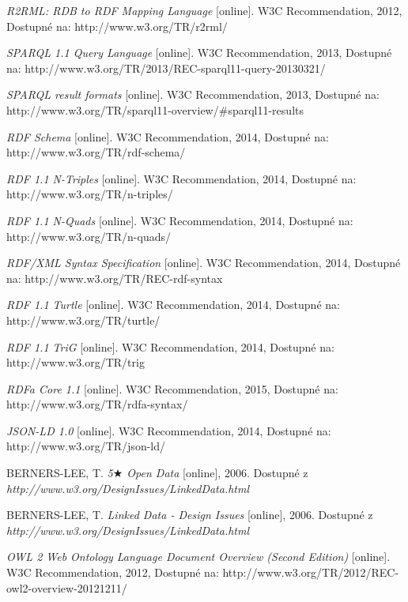 \begin{thebibliography}{99}
  \emph{R2RML: RDB to RDF Mapping Language} 
  [online]. W3C Recommendation, 2012, Dostupné na: 
  http://www.w3.org/TR/r2rml/
  
  \emph{SPARQL 1.1 Query Language} 
  [online]. W3C Recommendation, 2013, Dostupné na: 
  http://www.w3.org/TR/2013/REC-sparql11-query-20130321/

  \emph{SPARQL result formats} 
  [online]. W3C Recommendation, 2013, Dostupné na: 
  http://www.w3.org/TR/sparql11-overview/\#sparql11-results
  
  \emph{RDF Schema} 
  [online]. W3C Recommendation, 2014, Dostupné na: 
  http://www.w3.org/TR/rdf-schema/ 
  
  \emph{RDF 1.1 N-Triples} 
  [online]. W3C Recommendation, 2014, Dostupné na: 
  http://www.w3.org/TR/n-triples/ 
  
  \emph{RDF 1.1 N-Quads} 
  [online]. W3C Recommendation, 2014, Dostupné na: 
  http://www.w3.org/TR/n-quads/ 

  \emph{RDF/XML Syntax Specification} 
  [online]. W3C Recommendation, 2014, Dostupné na: 
  http://www.w3.org/TR/REC-rdf-syntax 
  
  \emph{RDF 1.1 Turtle} 
  [online]. W3C Recommendation, 2014, Dostupné na: 
  http://www.w3.org/TR/turtle/

  \emph{RDF 1.1 TriG} 
  [online]. W3C Recommendation, 2014, Dostupné na: 
  http://www.w3.org/TR/trig
  
  \emph{RDFa Core 1.1} 
  [online]. W3C Recommendation, 2015, Dostupné na: 
  http://www.w3.org/TR/rdfa-syntax/
  
  \emph{JSON-LD 1.0} 
  [online]. W3C Recommendation, 2014, Dostupné na: 
  http://www.w3.org/TR/json-ld/

  BERNERS-LEE, T.
  \emph{5$\bigstar$ Open Data}
  [online], 2006. Dostupné z 
  \emph{http://www.w3.org/DesignIssues/LinkedData.html}  
  
  BERNERS-LEE, T.
  \emph{Linked Data - Design Issues}
  [online], 2006. Dostupné z 
  \emph{http://www.w3.org/DesignIssues/LinkedData.html}  
  
  \emph{OWL 2 Web Ontology Language Document Overview (Second Edition)} 
  [online]. W3C Recommendation, 2012, Dostupné na: 
  http://www.w3.org/TR/2012/REC-owl2-overview-20121211/
  

\end{thebibliography}
